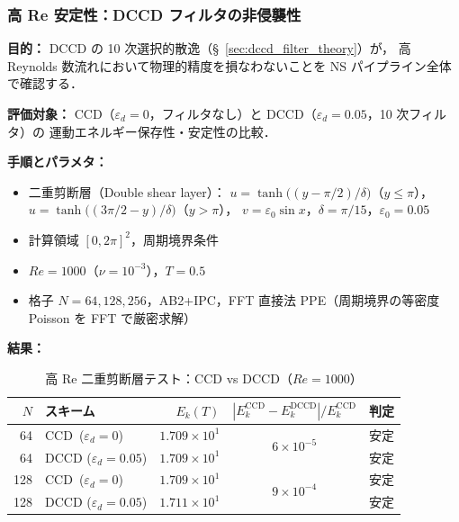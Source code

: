 %
\subsubsection{高 Re 安定性：DCCD フィルタの非侵襲性}
\label{sec:highre_dccd}

\noindent\textbf{目的：}
DCCD の 10 次選択的散逸（§~\ref{sec:dccd_filter_theory}）が，
高 Reynolds 数流れにおいて物理的精度を損なわないことを NS パイプライン全体で確認する．

\noindent\textbf{評価対象：}
CCD（$\varepsilon_d = 0$，フィルタなし）と
DCCD（$\varepsilon_d = 0.05$，10 次フィルタ）の
運動エネルギー保存性・安定性の比較．

\noindent\textbf{手順とパラメタ：}
\begin{itemize}[noitemsep]
  \item 二重剪断層（Double shear layer）：
        $u = \tanh\bigl((y - \pi/2)/\delta\bigr)$（$y \leq \pi$），
        $u = \tanh\bigl((3\pi/2 - y)/\delta\bigr)$（$y > \pi$），
        $v = \varepsilon_0\sin x$，$\delta = \pi/15$，$\varepsilon_0 = 0.05$
  \item 計算領域 $[0, 2\pi]^2$，周期境界条件
  \item $\mathit{Re} = 1000$（$\nu = 10^{-3}$），$T = 0.5$
  \item 格子 $N = 64, 128, 256$，AB2+IPC，FFT 直接法 PPE（周期境界の等密度 Poisson を FFT で厳密求解）
\end{itemize}

\noindent\textbf{結果：}

\begin{table}[htbp]
\centering
\caption{高 Re 二重剪断層テスト：CCD vs DCCD（$\mathit{Re} = 1000$）}
\label{tab:highre_dccd}
\renewcommand{\arraystretch}{1.3}
\begin{tabular}{rlrcl}
\toprule
$N$ & スキーム & $E_k(T)$ & $|E_k^{\text{CCD}} - E_k^{\text{DCCD}}| / E_k^{\text{CCD}}$ & 判定 \\
\midrule
  64 & CCD\, ($\varepsilon_d{=}0$)    & $1.709 \times 10^{1}$ & \multirow{2}{*}{$6 \times 10^{-5}$} & 安定 \\
  64 & DCCD ($\varepsilon_d{=}0.05$) & $1.709 \times 10^{1}$ &  & 安定 \\
\midrule
 128 & CCD\, ($\varepsilon_d{=}0$)    & $1.709 \times 10^{1}$ & \multirow{2}{*}{$9 \times 10^{-4}$} & 安定 \\
 128 & DCCD ($\varepsilon_d{=}0.05$) & $1.711 \times 10^{1}$ &  & 安定 \\
\bottomrule
\end{tabular}
\end{table}

